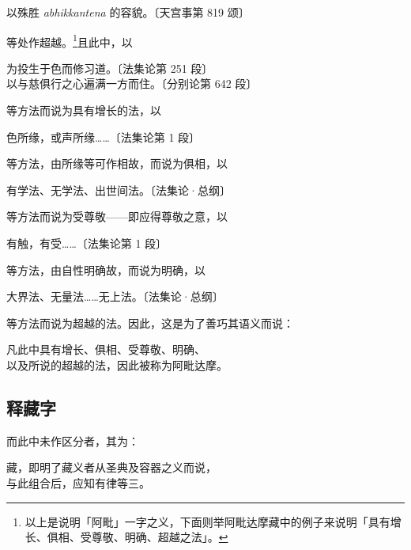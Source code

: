 \begin{quoting}以殊胜 {\footnotesize \textit{abhikkantena}} 的容貌。{\bluefootnotesize 〔天宫事第 819 颂〕}\end{quoting}

等处作超越。\footnote{以上是说明「阿毗」一字之义，下面则举阿毗达摩藏中的例子来说明「具有增长、俱相、受尊敬、明确、超越之法」。}且此中，以

\begin{quoting}为投生于色而修习道。{\bluefootnotesize 〔法集论第 251 段〕}\\以与慈俱行之心遍满一方而住。{\bluefootnotesize 〔分别论第 642 段〕}\end{quoting}

等方法而说为具有增长的法，以

\begin{quoting}色所缘，或声所缘……{\bluefootnotesize 〔法集论第 1 段〕}\end{quoting}

等方法，由所缘等可作相故，而说为俱相，以

\begin{quoting}有学法、无学法、出世间法。{\bluefootnotesize 〔法集论·总纲〕}\end{quoting}

等方法而说为受尊敬——即应得尊敬之意，以

\begin{quoting}有触，有受……{\bluefootnotesize 〔法集论第 1 段〕}\end{quoting}

等方法，由自性明确故，而说为明确，以

\begin{quoting}大界法、无量法……无上法。{\bluefootnotesize 〔法集论·总纲〕}\end{quoting}

等方法而说为超越的法。因此，这是为了善巧其语义而说：

\begin{quoting}凡此中具有增长、俱相、受尊敬、明确、\\以及所说的超越的法，因此被称为阿毗达摩。\end{quoting}

\subsection*{释藏字}

而此中未作区分者，其为：

\begin{quoting}藏，即明了藏义者从圣典及容器之义而说，\\与此组合后，应知有律等三。\end{quoting}

